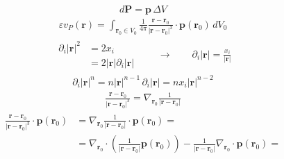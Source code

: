 \documentclass[letterpaper,10pt,english]{jupyterBook}
\begin{document}
\sphinxAtStartPar
{}
\begin{equation*}
\begin{split}d \mathbf{P} = \mathbf{p} \, \Delta V\end{split}
\end{equation*}\begin{equation*}
\begin{split}\varepsilon v_P(\mathbf{r}) = \int_{\mathbf{r}_0 \in V_0} \frac{1}{4 \pi}
 \frac{\mathbf{r} - \mathbf{r}_0}{\left|\mathbf{r} - \mathbf{r}_0 \right|^3} \cdot \mathbf{p}(\mathbf{r}_0) \, dV_0 \end{split}
\end{equation*}\begin{equation*}
\begin{split}\begin{aligned}
\partial_i |\mathbf{r}|^2 & = 2 x_i \\
                          & = 2 |\mathbf{r}| \partial_i |\mathbf{r}|
\end{aligned}
\qquad \rightarrow \qquad \partial_i |\mathbf{r}| = \frac{x_i}{|\mathbf{r}|}\end{split}
\end{equation*}\begin{equation*}
\begin{split}\partial_i |\mathbf{r}|^n = n |\mathbf{r}|^{n-1} \, \partial_i |\mathbf{r}| = n x_i |\mathbf{r}|^{n-2}\end{split}
\end{equation*}\begin{equation*}
\begin{split}\frac{\mathbf{r}-\mathbf{r}_0}{|\mathbf{r}-\mathbf{r}_0|^3} = \nabla_{\mathbf{r}_0} \frac{1}{|\mathbf{r}-\mathbf{r}_0|}\end{split}
\end{equation*}\begin{equation*}
\begin{split}\begin{aligned}
\frac{\mathbf{r}- \mathbf{r}_0}{|\mathbf{r}- \mathbf{r}_0|^3} \cdot \mathbf{p}(\mathbf{r}_0) 
 & = \nabla_{\mathbf{r}_0} \frac{1}{|\mathbf{r}-\mathbf{r}_0|} \cdot \mathbf{p}(\mathbf{r}_0) = \\
 & = \nabla_{\mathbf{r}_0} \cdot \left( \frac{1}{|\mathbf{r}-\mathbf{r}_0|} \mathbf{p}(\mathbf{r}_0) \right) - \frac{1}{|\mathbf{r}- \mathbf{r}_0|} \nabla_{\mathbf{r}_0} \cdot \mathbf{p}(\mathbf{r}_0) = \\
\end{aligned}\end{split}
\end{equation*}
\end{document}
